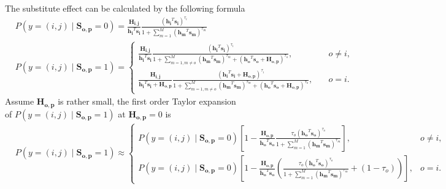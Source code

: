 \documentclass[12pt]{article}
\theoremstyle{definition}
\newcommand{\matr}[1]{\mathbf{#1}} %
\begin{document}
\begin{sloppypar}
The substitute effect can be calculated by the following formula 
\begin{align*}
    &P(y=(i,j) \mid \matr{S_{o,p}}=0) =  \frac{\matr{H_{i,j}}}
    {\matr{h_i}^T \matr{s_i}} \frac{(\matr{h_i}^T \matr{s_i})^{\tau_i}}{1+\sum_{m=1}^{M} (\matr{h_m}^T\matr{s_m})^{\tau_m}}\\
    &P(y=(i,j) \mid \matr{S_{o,p}} = 1)=
    \begin{cases}
        \frac{\matr{H_{i,j}}}
        {\matr{h_i}^T \matr{s_i}} \frac{(\matr{h_i}^T \matr{s_i})^{\tau_i}}{1+\sum
        \limits_{m=1, m \neq o}^{M} (\matr{h_m}^T\matr{s_m})^{\tau_m}+(\matr{h_o}^T \matr{s_o}+\matr{H_{o,p}})^{\tau_o}}, &\quad o \neq i,\\
        \frac{\matr{H_{i,j}}}
        {\matr{h_i}^T \matr{s_i}+\matr{H_{o,p}}} \frac{(\matr{h_i}^T \matr{s_i}+\matr{H_{o,p}})^{\tau_i}}{1+\sum\limits_{m=1, m \neq o}^{M} (\matr{h_m}^T\matr{s_m})^{\tau_m}+(\matr{h_o}^T \matr{s_o}+\matr{H_{o,p}})^{\tau_o}}, &\quad o = i.
    \end{cases}
\end{align*}
Assume $\matr{H_{o,p}}$ is rather small, the first order Taylor expansion \\ 
of $P(y=(i,j) \mid \matr{S_{o,p}} = 1)$ at $\matr{H_{o,p}}=0$ is
\begin{align}\label{p proun}
    &P(y=(i,j) \mid \matr{S_{o,p}} = 1) \approx
    \begin{cases}
        P(y=(i,j) \mid \matr{S_{o,p}} = 0)[1-\frac{\matr{H_{o,p}}}{\matr{h_o}^T \matr{s_o}}\frac{\tau_o(\matr{h_o}^T \matr{s_o})^{\tau_o}}{1+\sum_{m=1}^{M} (\matr{h_m}^T\matr{s_m})^{\tau_m}}], &o \neq i,\\
        P(y=(i,j) \mid \matr{S_{o,p}} = 0)[1-\frac{\matr{H_{o,p}}}{\matr{h_o}^T \matr{s_o}}(\frac{\tau_o(\matr{h_o}^T\matr{s_o})^{\tau_o}}{1+\sum_{m=1}^{M} (\matr{h_m}^T\matr{s_m})^{\tau_m}}+(1-\tau_o))], &o = i.
    \end{cases}
\end{align}


\end{sloppypar}
\end{document}
